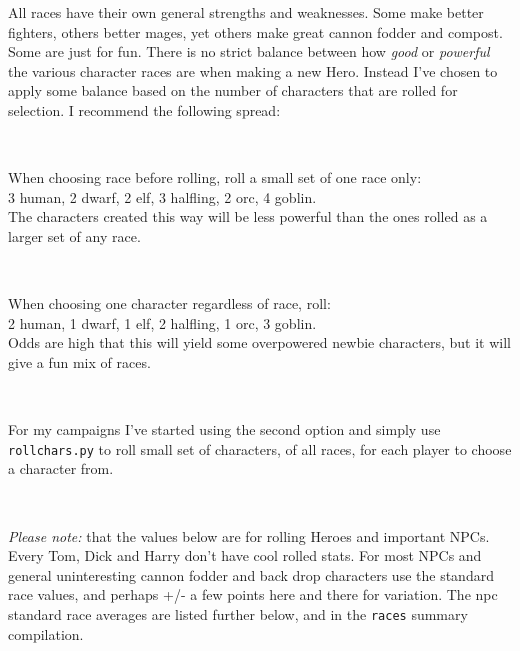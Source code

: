 \noindent All races have their own general strengths and weaknesses. Some make better fighters, others better mages, yet others make great cannon fodder and compost. Some are just for fun.
There is no strict balance between how \emph{good} or \emph{powerful} the various character races are when making a new Hero. Instead I've chosen to apply some balance based on the number of characters that are rolled for selection. I recommend the following spread:

\

When choosing race before rolling, roll a small set of one race only:\\
3 human, 2 dwarf, 2 elf, 3 halfling, 2 orc, 4 goblin.\\
The characters created this way will be less powerful than the ones rolled as a larger set of any race.

\

When choosing one character regardless of race, roll:\\
2 human, 1 dwarf, 1 elf, 2 halfling, 1 orc, 3 goblin.\\
Odds are high that this will yield some overpowered newbie characters, but it will give a fun mix of races.

\

For my campaigns I've started using the second option and simply use \verb|rollchars.py| to roll small set of characters, of all races, for each player to choose a character from.

\

\emph{Please note:} that the values below are for rolling Heroes and important NPCs. Every Tom, Dick and Harry don't have cool rolled stats. For most NPCs and general uninteresting cannon fodder and back drop characters use the standard race values, and perhaps +/- a few points here and there for variation. The npc standard race averages are listed further below, and in the \verb|races| summary compilation.








